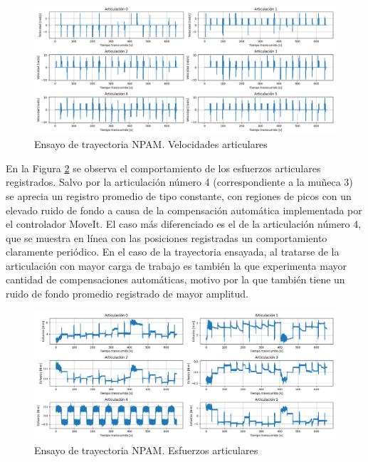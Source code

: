 \begin{figure}[h!]
    \centering
    \includegraphics[scale=0.40]{figuras/ensayo_trayectorias/velocidad escala 0.1.png}
    \caption{Ensayo de trayectoria \acrshort{NPAM}. Velocidades articulares}
    \label{fig: velocidades ensayo trayectoria NPAM}
\end{figure}

En la Figura \ref{fig: esfuerzos ensayo trayectoria NPAM} se observa el comportamiento de los esfuerzos articulares registrados. Salvo por la articulación número 4 (correspondiente a la muñeca 3) se aprecia un registro promedio de tipo constante, con regiones de picos con un elevado ruido de fondo a causa de la compensación automática implementada por el controlador MoveIt. El caso más diferenciado es el de la articulación número 4, que se muestra en línea con las posiciones registradas un comportamiento claramente periódico. En el caso de la trayectoria ensayada, al tratarse de la articulación con mayor carga de trabajo es también la que experimenta mayor cantidad de compensaciones automáticas, motivo por la que también tiene un ruido de fondo promedio registrado de mayor amplitud.

\begin{figure}[H]
    \centering
    \includegraphics[scale=0.40]{figuras/ensayo_trayectorias/esfuerzos escala 0.1.png}
    \caption{Ensayo de trayectoria \acrshort{NPAM}. Esfuerzos articulares}
    \label{fig: esfuerzos ensayo trayectoria NPAM}
\end{figure}

